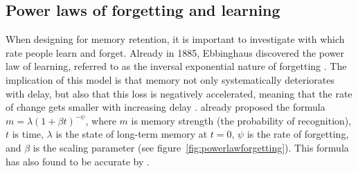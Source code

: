 \subsection{Power laws of forgetting and learning}

When designing for memory retention, it is important to investigate with which rate people learn and forget. Already in 1885, Ebbinghaus discovered the power law of learning, referred to as the inversal exponential nature of forgetting \cite{microlearning, activationbasedmodel}. The implication of this model is that memory not only systematically deteriorates with delay, but also that this loss is negatively accelerated, meaning that the rate of change gets smaller with increasing delay \cite{cognitivepsychology}.  already proposed the formula $m = \lambda (1 + \beta t)^{-\psi}$, where $m$ is memory strength (the probability of recognition), $t$ is time, $\lambda$ is the state of long-term memory at $t = 0$, $\psi$ is the rate of forgetting, and $\beta$ is the scaling parameter (see figure~\ref{fig:powerlawforgetting}). This formula has also found to be accurate by . 

